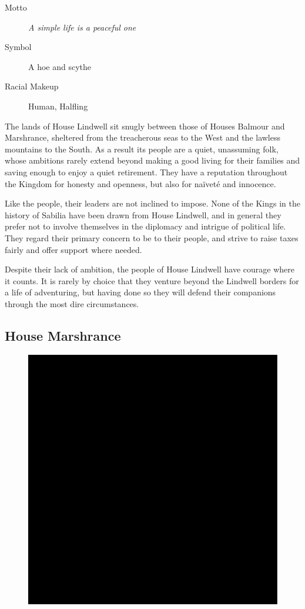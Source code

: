 \documentclass[10pt,twoside,openright,a4paper,twocolumn]{book}
\begin{document}
\begin{description}
\item[Motto] \textit{A simple life is a peaceful one}

\item[Symbol] A hoe and scythe

\item[Racial Makeup] Human, Halfling
\end{description}

\noindent
The lands of House Lindwell sit snugly between those of Houses Balmour
and Marshrance, sheltered from the treacherous seas to the West and the
lawless mountains to the South.  As a result its people are a quiet, unassuming
folk, whose ambitions rarely extend beyond making a good living for their
families and saving enough to enjoy a quiet retirement.  They have a
reputation throughout the Kingdom for honesty and openness, but also for
na{\"i}vet{\'e} and innocence.

Like the people, their leaders are not inclined to impose.  None of the Kings
in the history of Sabilia have been drawn from House Lindwell, and in
general they prefer not to involve themselves in the diplomacy and intrigue
of political life.  They regard their primary concern to be to their people, and
strive to raise taxes fairly and offer support where needed.

Despite their lack of ambition, the people of House Lindwell have courage
where it counts. It is rarely by choice that they venture beyond the Lindwell
borders for a life of adventuring, but having done so they will defend their
companions through the most dire circumstances.

\subsection*{House Marshrance}

\begin{figure}
  \includegraphics[width=0.48\columnwidth]{images/HouseMarshrance}
\end{figure}
\end{document}
